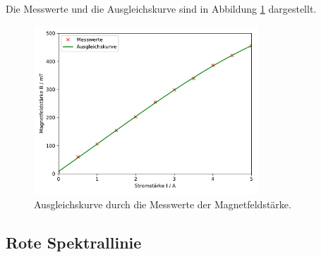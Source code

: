 \noindent
Die Messwerte und die Ausgleichskurve sind in Abbildung \ref{fig:bfeld} dargestellt.

\begin{figure}
    \centering
    \includegraphics[width=0.75\textwidth]{data/Magnetfeld.pdf}
    \caption{Ausgleichskurve durch die Messwerte der Magnetfeldstärke.}
    \label{fig:bfeld}
  \end{figure}

\subsection{Rote Spektrallinie}